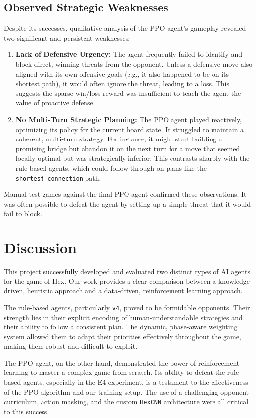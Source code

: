 \documentclass[conference]{IEEEtran}
\begin{document}
\subsection{Observed Strategic Weaknesses}
Despite its successes, qualitative analysis of the PPO agent's gameplay revealed two significant and persistent weaknesses:
\begin{enumerate}
    \item \textbf{Lack of Defensive Urgency:} The agent frequently failed to identify and block direct, winning threats from the opponent. Unless a defensive move also aligned with its own offensive goals (e.g., it also happened to be on its shortest path), it would often ignore the threat, leading to a loss. This suggests the sparse win/loss reward was insufficient to teach the agent the value of proactive defense.
    \item \textbf{No Multi-Turn Strategic Planning:} The PPO agent played reactively, optimizing its policy for the current board state. It struggled to maintain a coherent, multi-turn strategy. For instance, it might start building a promising bridge but abandon it on the next turn for a move that seemed locally optimal but was strategically inferior. This contrasts sharply with the rule-based agents, which could follow through on plans like the \texttt{shortest\_connection} path.
\end{enumerate}
Manual test games against the final PPO agent confirmed these observations. It was often possible to defeat the agent by setting up a simple threat that it would fail to block.

\section{Discussion}
This project successfully developed and evaluated two distinct types of AI agents for the game of Hex. Our work provides a clear comparison between a knowledge-driven, heuristic approach and a data-driven, reinforcement learning approach.

The rule-based agents, particularly \texttt{v4}, proved to be formidable opponents. Their strength lies in their explicit encoding of human-understandable strategies and their ability to follow a consistent plan. The dynamic, phase-aware weighting system allowed them to adapt their priorities effectively throughout the game, making them robust and difficult to exploit.

The PPO agent, on the other hand, demonstrated the power of reinforcement learning to master a complex game from scratch. Its ability to defeat the rule-based agents, especially in the E4 experiment, is a testament to the effectiveness of the PPO algorithm and our training setup. The use of a challenging opponent curriculum, action masking, and the custom \texttt{HexCNN} architecture were all critical to this success.
\end{document}
